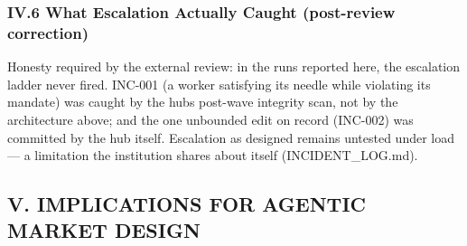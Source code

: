 \documentclass[
]{article}
\begin{document}
\subsubsection{IV.6 What Escalation Actually Caught (post-review
correction)}\label{iv6-what-escalation-actually-caught-post-review-correction}

Honesty required by the external review: in the runs reported here, the
escalation ladder never fired. INC-001 (a worker satisfying its needle
while violating its mandate) was caught by the hub\textquotesingle s
post-wave integrity scan, not by the architecture above; and the one
unbounded edit on record (INC-002) was committed by the hub itself.
Escalation as designed remains untested under load --- a limitation the
institution shares about itself (INCIDENT\_LOG.md).

\subsection{V. IMPLICATIONS FOR AGENTIC MARKET
DESIGN}\label{v-implications-for-agentic-market-design}
\end{document}
